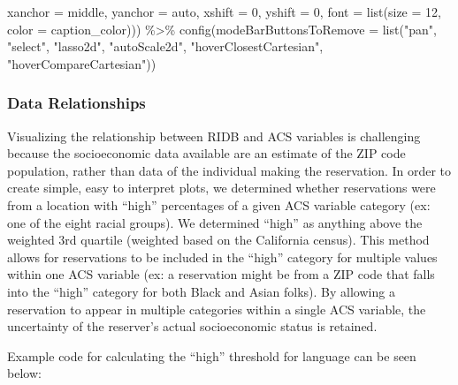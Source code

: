 \documentclass[
  11 pt,
  openany]{book}
\newenvironment{Shaded}{\begin{snugshade}}{\end{snugshade}}
\newcommand{\AttributeTok}[1]{\textcolor[rgb]{0.77,0.63,0.00}{#1}}
\newcommand{\DecValTok}[1]{\textcolor[rgb]{0.00,0.00,0.81}{#1}}
\newcommand{\FunctionTok}[1]{\textcolor[rgb]{0.00,0.00,0.00}{#1}}
\newcommand{\NormalTok}[1]{#1}
\newcommand{\SpecialCharTok}[1]{\textcolor[rgb]{0.00,0.00,0.00}{#1}}
\newcommand{\StringTok}[1]{\textcolor[rgb]{0.31,0.60,0.02}{#1}}
\begin{document}
\begin{Shaded}
\begin{Highlighting}[]
                             \AttributeTok{xanchor =} \StringTok{\textquotesingle{}middle\textquotesingle{}}\NormalTok{, }\AttributeTok{yanchor =} \StringTok{\textquotesingle{}auto\textquotesingle{}}\NormalTok{, }
                             \AttributeTok{xshift =} \DecValTok{0}\NormalTok{, }\AttributeTok{yshift =} \DecValTok{0}\NormalTok{,}
                             \AttributeTok{font =} \FunctionTok{list}\NormalTok{(}\AttributeTok{size =} \DecValTok{12}\NormalTok{, }\AttributeTok{color =}\NormalTok{ caption\_color))) }\SpecialCharTok{\%\textgreater{}\%}
  \FunctionTok{config}\NormalTok{(}\AttributeTok{modeBarButtonsToRemove =} \FunctionTok{list}\NormalTok{(}\StringTok{"pan"}\NormalTok{, }\StringTok{"select"}\NormalTok{, }\StringTok{"lasso2d"}\NormalTok{, }\StringTok{"autoScale2d"}\NormalTok{, }
                                       \StringTok{"hoverClosestCartesian"}\NormalTok{, }
                                       \StringTok{"hoverCompareCartesian"}\NormalTok{))}
\end{Highlighting}
\end{Shaded}

\hypertarget{data-relationships}{%
\subsubsection{Data Relationships}\label{data-relationships}}

Visualizing the relationship between RIDB and ACS variables is challenging because the socioeconomic data available are an estimate of the ZIP code population, rather than data of the individual making the reservation. In order to create simple, easy to interpret plots, we determined whether reservations were from a location with ``high'' percentages of a given ACS variable category (ex: one of the eight racial groups). We determined ``high'' as anything above the weighted 3rd quartile (weighted based on the California census). This method allows for reservations to be included in the ``high'' category for multiple values within one ACS variable (ex: a reservation might be from a ZIP code that falls into the ``high'' category for both Black and Asian folks). By allowing a reservation to appear in multiple categories within a single ACS variable, the uncertainty of the reserver's actual socioeconomic status is retained.

Example code for calculating the ``high'' threshold for language can be seen below:
\end{document}
